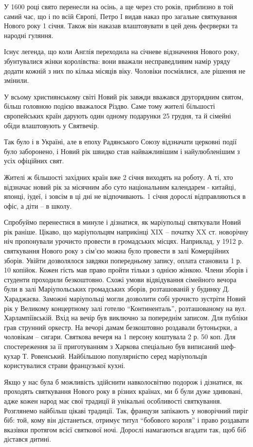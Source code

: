 У 1600 році свято перенесли на осінь, а ще через сто років, приблизно в той
самий час, що і по всій Європі, Петро I видав наказ про загальне святкування
Нового року 1 січня. Також він наказав влаштовувати в цей день феєрверки та
народні гуляння.

Існує легенда, що коли Англія переходила на січневе відзначення Нового року,
збунтувалися жінки королівства: вони вважали несправедливим намір уряду додати
кожній з них по кілька місяців віку. Чоловіки посміялися, але рішення не
змінили.

У всьому християнському світі Новий рік завжди вважався другорядним святом,
більш головною подією вважалося Різдво. Саме тому жителі більшості європейських
країн дарують один одному подарунки 25 грудня, та й сімейні обіди влаштовують у
Святвечір.

Так було і в Україні, але в епоху Радянського Союзу відзначати церковні події
було заборонено, і Новий рік швидко став найважливішим і найулюбленішим з усіх
офіційних свят.

Жителі ж більшості західних країн вже 2 січня виходять на роботу. А ті, хто
відзначає новий рік за місячним або суто національним календарем - китайці,
японці, іудеї, і зовсім в ці дні не відпочивають. 1 січня дорослі
відправляються в офіс, а діти – в школу.

Спробуймо перенестися в минуле і дізнатися, як маріупольці святкували Новий рік
раніше. Цікаво, що маріупольцям наприкінці XIX – початку XX ст. новорічну ніч
пропонували урочисто провести в громадських місцях. Наприклад, у 1912 р.
святкування Нового року з сім'єю можна було провести в залі Комерційних зборів.
Увійти дозволялося завдяки попередньому запису, оплата становила 1 р. 10
копійок. Кожен гість мав право пройти тільки з однією жінкою. Члени зборів і
студенти проходили безкоштовно. Схожі умови відвідування сімейного вечора були
в залі Маріупольських громадських зборів, розташованій у будинку Д. Хараджаєва.
Заможні маріупольці могли дозволити собі урочисто зустріти Новий рік у Великому
концертному залі готелю \enquote{Континенталь}, розташованому на вул. Харлампіївській.
Вхід на вечір був виключно за попереднім записом. Для публіки грав струнний
оркестр. На вечорі дамам безкоштовно роздавали бутоньєрки, а чоловікам –
сигари. Святкова вечеря на 1 персону коштувала 2 р. 50 коп. Для спостереження
за її приготуванням з Харкова спеціально був виписаний шеф-кухар Т. Ровенський.
Найбільшою популярністю серед маріупольців користувалися страви французької
кухні.

Якщо у нас була б можливість здійснити навколосвітню подорож і дізнатися, як
проходять святкування Нового року в різних країнах, ми б були дуже здивовані,
адже кожен народ має свої традиції й унікальні особливості святкування.
Розглянемо найбільш цікаві традиції. Так, французи запікають у новорічний пиріг
біб: той, кому він дістанеться, отримує титул \enquote{бобового короля} і право
роздавати вказівки протягом всієї святкової ночі. Дорослі намагаються вгадати
так, щоб біб дістався дитині.

